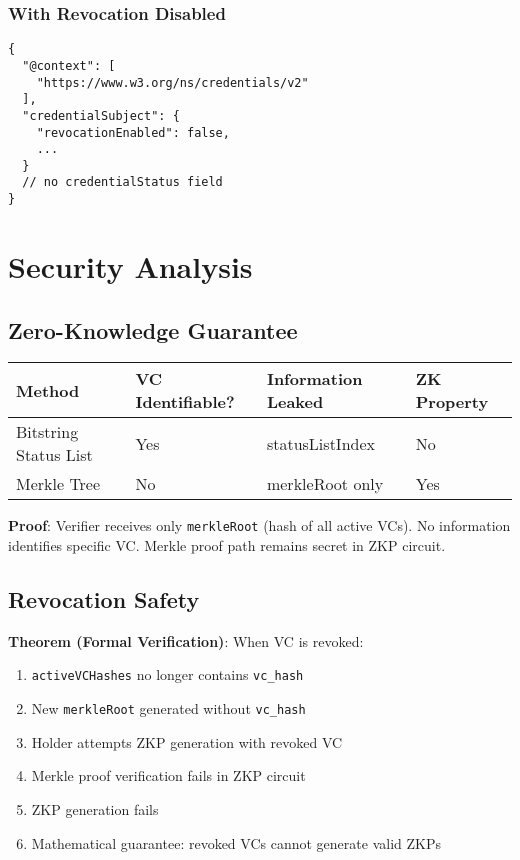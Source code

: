 \subsubsection{With Revocation Disabled}

\begin{verbatim}
{
  "@context": [
    "https://www.w3.org/ns/credentials/v2"
  ],
  "credentialSubject": {
    "revocationEnabled": false,
    ...
  }
  // no credentialStatus field
}
\end{verbatim}

\section{Security Analysis}

\subsection{Zero-Knowledge Guarantee}

\begin{table}[h]
\centering
\begin{tabular}{|l|l|l|l|}
\hline
\textbf{Method} & \textbf{VC Identifiable?} & \textbf{Information Leaked} & \textbf{ZK Property} \\
\hline
Bitstring Status List & Yes & statusListIndex & No \\
\hline
Merkle Tree & No & merkleRoot only & Yes \\
\hline
\end{tabular}
\end{table}

\textbf{Proof}: Verifier receives only \texttt{merkleRoot} (hash of all active VCs). No information identifies specific VC. Merkle proof path remains secret in ZKP circuit.

\subsection{Revocation Safety}

\textbf{Theorem (Formal Verification)}: When VC is revoked:

\begin{enumerate}
  \item \texttt{activeVCHashes} no longer contains \texttt{vc\_hash}
  \item New \texttt{merkleRoot} generated without \texttt{vc\_hash}
  \item Holder attempts ZKP generation with revoked VC
  \item Merkle proof verification fails in ZKP circuit
  \item ZKP generation fails
  \item Mathematical guarantee: revoked VCs cannot generate valid ZKPs
\end{enumerate}

